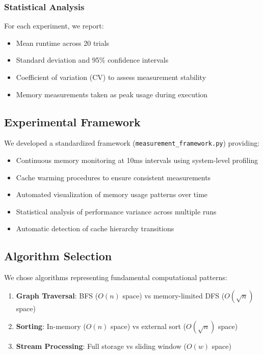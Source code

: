 \documentclass[11pt]{article}
\theoremstyle{definition}
\begin{document}
\subsubsection{Statistical Analysis}
For each experiment, we report:
\begin{itemize}
\item Mean runtime across 20 trials
\item Standard deviation and 95\% confidence intervals
\item Coefficient of variation (CV) to assess measurement stability
\item Memory measurements taken as peak usage during execution
\end{itemize}

\subsection{Experimental Framework}

We developed a standardized framework (\texttt{measurement\_framework.py}) providing:
\begin{itemize}
\item Continuous memory monitoring at 10ms intervals using system-level profiling
\item Cache warming procedures to ensure consistent measurements  
\item Automated visualization of memory usage patterns over time
\item Statistical analysis of performance variance across multiple runs
\item Automatic detection of cache hierarchy transitions
\end{itemize}

\subsection{Algorithm Selection}

We chose algorithms representing fundamental computational patterns:
\begin{enumerate}
\item \textbf{Graph Traversal}: BFS ($O(n)$ space) vs memory-limited DFS ($O(\sqrt{n})$ space)
\item \textbf{Sorting}: In-memory ($O(n)$ space) vs external sort ($O(\sqrt{n})$ space)  
\item \textbf{Stream Processing}: Full storage vs sliding window ($O(w)$ space)
\end{enumerate}
\end{document}
